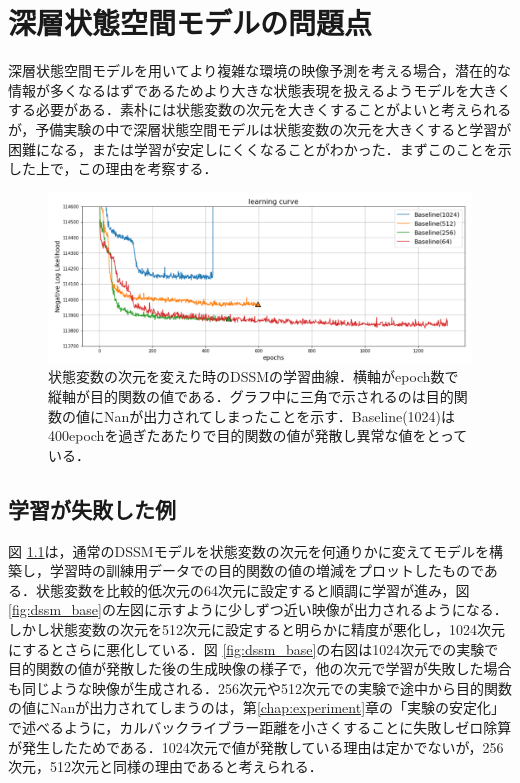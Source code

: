 \chapter{深層状態空間モデルの問題点}
\label{chap:baseline}

深層状態空間モデルを用いてより複雑な環境の映像予測を考える場合，潜在的な情報が多くなるはずであるためより大きな状態表現を扱えるようモデルを大きくする必要がある．素朴には状態変数の次元を大きくすることがよいと考えられるが，予備実験の中で深層状態空間モデルは状態変数の次元を大きくすると学習が困難になる，または学習が安定しにくくなることがわかった．まずこのことを示した上で，この理由を考察する．

\begin{figure}[bp]
  \begin{center}
    \includegraphics[width=\linewidth]{./figures/dssm_curve.png}
    \caption[状態変数の次元を変えた時のDSSMの学習曲線]{状態変数の次元を変えた時のDSSMの学習曲線．横軸がepoch数で縦軸が目的関数の値である．グラフ中に三角で示されるのは目的関数の値にNanが出力されてしまったことを示す．Baseline(1024)は400epochを過ぎたあたりで目的関数の値が発散し異常な値をとっている．}
    \label{fig:dssm_curve}
  \end{center}
\end{figure}

\section{学習が失敗した例}
図 \ref{fig:dssm_curve}は，通常のDSSMモデルを状態変数の次元を何通りかに変えてモデルを構築し，学習時の訓練用データでの目的関数の値の増減をプロットしたものである．状態変数を比較的低次元の64次元に設定すると順調に学習が進み，図 \ref{fig:dssm_base}の左図に示すように少しずつ近い映像が出力されるようになる．しかし状態変数の次元を512次元に設定すると明らかに精度が悪化し，1024次元にするとさらに悪化している．図 \ref{fig:dssm_base}の右図は1024次元での実験で目的関数の値が発散した後の生成映像の様子で，他の次元で学習が失敗した場合も同じような映像が生成される．256次元や512次元での実験で途中から目的関数の値にNanが出力されてしまうのは，第\ref{chap:experiment}章の「実験の安定化」で述べるように，カルバックライブラー距離を小さくすることに失敗しゼロ除算が発生したためである．1024次元で値が発散している理由は定かでないが，256次元，512次元と同様の理由であると考えられる．

